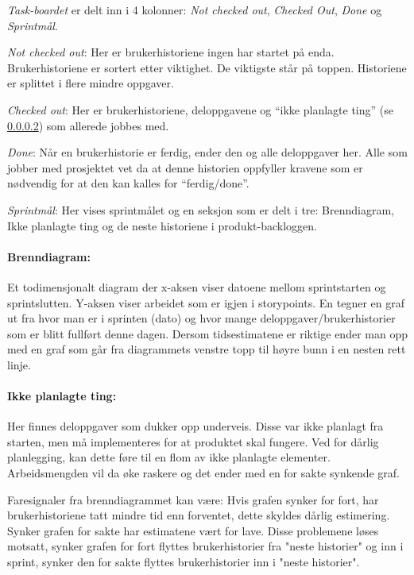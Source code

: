\documentclass[12pt,a4paper,norsk]{article}
\begin{document}
    \textit{Task-boardet} er delt inn i 4 kolonner: \textit{Not checked out}, \textit{Checked Out}, \textit{Done} og \textit{Sprintmål}.

    \textit{Not checked out}: Her er brukerhistoriene ingen har startet på enda. Brukerhistoriene er sortert etter viktighet. De viktigste står på toppen. Historiene er splittet i flere mindre oppgaver.

    \textit{Checked out}: Her er brukerhistoriene, deloppgavene og “ikke planlagte ting” (se \ref{subsec:ikkeplanlagt}) som allerede jobbes med.

    \textit{Done}: Når en brukerhistorie er ferdig, ender den og alle deloppgaver her. Alle som jobber med prosjektet vet da at denne historien oppfyller kravene som er nødvendig for at den kan kalles for “ferdig/done”.

    \textit{Sprintmål}: Her vises sprintmålet og en seksjon som er delt i tre: Brenndiagram, Ikke planlagte ting og de neste historiene i produkt-backloggen.

    \paragraph{Brenndiagram:}
    Et todimensjonalt diagram der x-aksen viser datoene mellom sprintstarten og sprintslutten. Y-aksen viser arbeidet som er igjen i storypoints. En tegner en graf ut fra hvor man er i sprinten (dato) og hvor mange deloppgaver/brukerhistorier som er blitt fullført denne dagen. Dersom tidsestimatene er riktige ender man opp med en graf som går fra diagrammets venstre topp til høyre bunn i en nesten rett linje.

    \paragraph{Ikke planlagte ting:}\label{subsec:ikkeplanlagt}
    Her finnes deloppgaver som dukker opp underveis. Disse var ikke planlagt fra starten, men må implementeres for at produktet skal fungere. Ved for dårlig planlegging, kan dette føre til en flom av ikke planlagte elementer. Arbeidsmengden vil da øke raskere og det ender med en for sakte synkende graf.

    Faresignaler fra brenndiagrammet kan være: Hvis grafen synker for fort, har brukerhistoriene tatt mindre tid enn forventet, dette skyldes dårlig estimering. Synker grafen for sakte har estimatene vært for lave. Disse problemene løses motsatt, synker grafen for fort flyttes brukerhistorier fra "neste historier" og inn i sprint, synker den for sakte flyttes brukerhistorier inn i "neste historier".
\end{document}
